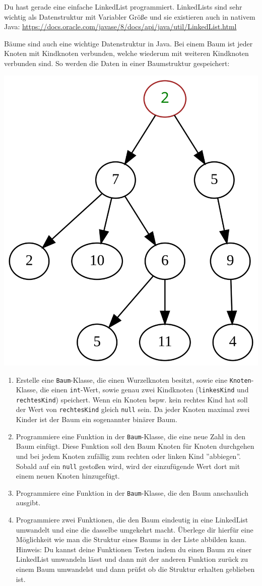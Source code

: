 \documentclass{../../sheet}
\begin{document}
Du hast gerade eine einfache LinkedList programmiert. LinkedLists sind sehr wichtig als Datenstruktur mit Variabler Größe und sie existieren auch in nativem Java: \url{https://docs.oracle.com/javase/8/docs/api/java/util/LinkedList.html}

\newpage
{}
Bäume sind auch eine wichtige Datenstruktur in Java. Bei einem Baum ist jeder Knoten mit Kindknoten verbunden, welche wiederum mit weiteren Kindknoten verbunden sind. So werden die Daten in einer Baumstruktur gespeichert:
\\
\begin{center}
    \includegraphics[width=0.5\linewidth]{img/baum.png}    
\end{center}

\begin{enumerate}
    \item Erstelle eine \texttt{Baum}-Klasse, die einen Wurzelknoten besitzt, sowie eine \texttt{Knoten}-Klasse, die einen \texttt{int}-Wert, sowie genau zwei Kindknoten (\texttt{linkesKind} und \texttt{rechtesKind}) speichert. Wenn ein Knoten bspw. kein rechtes Kind hat soll der Wert von \texttt{rechtesKind} gleich \texttt{null} sein. Da jeder Knoten maximal zwei Kinder ist der Baum ein sogenannter binärer Baum. 
    \item Programmiere eine Funktion in der \texttt{Baum}-Klasse, die eine neue Zahl in den Baum einfügt. Diese Funktion soll den Baum Knoten für Knoten durchgehen und bei jedem Knoten zufällig zum rechten oder linken Kind ''abbiegen''. Sobald auf ein \texttt{null} gestoßen wird, wird der einzufügende Wert dort mit einem neuen Knoten hinzugefügt. 
    \item Programmiere eine Funktion in der \texttt{Baum}-Klasse, die den Baum anschaulich ausgibt.
    \item Programmiere zwei Funktionen, die den Baum eindeutig in eine LinkedList umwandelt und eine die dasselbe umgekehrt macht. Überlege dir hierfür eine Möglichkeit wie man die Struktur eines Baums in der Liste abbilden kann. 
    Hinweis: Du kannst deine Funktionen Testen indem du einen Baum zu einer LinkedList umwandeln lässt und dann mit der anderen Funktion zurück zu einem Baum umwandelst und dann prüfst ob die Struktur erhalten geblieben ist. 
\end{enumerate}
\end{document}
